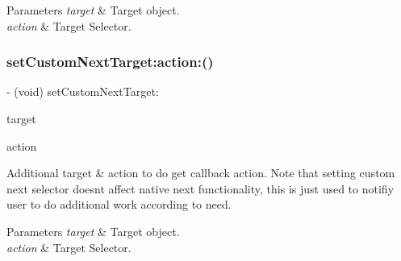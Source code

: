 \begin{DoxyParams}{Parameters}
{\em target} & Target object. \\
\hline
{\em action} & Target Selector. \\
\hline
\end{DoxyParams}
\mbox{\label{category_u_i_view_07_i_q_toolbar_addition_08_a37641999d83dba30e056e0fc815d0c98}} 
\subsubsection{\texorpdfstring{set\+Custom\+Next\+Target\+:action\+:()}{setCustomNextTarget:action:()}\hspace{0.1cm}{\footnotesize\ttfamily [1/3]}}
{\footnotesize\ttfamily -\/ (void) set\+Custom\+Next\+Target\+: \begin{DoxyParamCaption}\item[{(nullable id)}]{target }\item[{action:(nullable S\+EL)}]{action }\end{DoxyParamCaption}}

Additional target \& action to do get callback action. Note that setting custom {\ttfamily next} selector doesn\textquotesingle{}t affect native {\ttfamily next} functionality, this is just used to notifiy user to do additional work according to need.


\begin{DoxyParams}{Parameters}
{\em target} & Target object. \\
\hline
{\em action} & Target Selector. \\
\hline
\end{DoxyParams}
\mbox{\label{category_u_i_view_07_i_q_toolbar_addition_08_a37641999d83dba30e056e0fc815d0c98}} 
